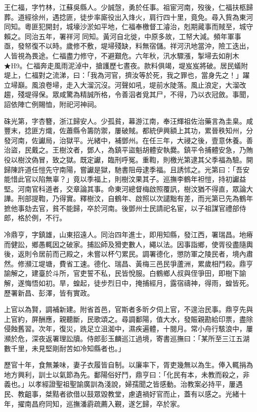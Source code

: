 \begin{pinyinscope}
王仁福，字竹林，江蘇吳縣人。少誠愨，勇於任事。祖宦河南，歿後，仁福扶柩歸葬。道經徐州，遇捻匪，徒步率廝役出入烽火，肩行四十里，竟免。尋入貲為東河同知。粵匪犯開封，城壕沙淤如平地，仁福奉檄督工濬治，剋期蕆事而賊至，城守賴之。同治五年，署祥河同知。黃河自北徙，中原多故，工帑大減。頻年軍事亟，發帑復不以時。歲修不敷，堤埽殘缺，料無宿儲。祥河汛地當沖，險工迭出，人皆視為畏途。仁福盡力修守，不避艱危。六年秋，汛水驟漲，掣埽去如削木★H9。仁福奔走風雨泥淖中，搶護歷七晝夜。款料俱竭，堤岌岌將破。居民蟻附堤上，仁福對之流涕，曰：「我為河官，擠汝等於死，我之罪也，當身先之！」躍立埽巔。風浪卷埽，走入大溜沉沒。河聲如吼，堤前水陡落。風止浪定，大溜改趨，殘堤得保。眾咸驚為精誠所格，令善泅者覓其尸，不得，乃以衣冠斂。事聞，詔依陣亡例賜恤，附祀河神祠。

硃光第，字杏簪，浙江歸安人。少孤貧，幕游江南，奉汪輝祖佐治藥言為圭臬。咸豐末，捻匪方熾，佐蕭縣令籌防禦，屢破賊。都統伊興額上其功，累晉秩知州，分發河南，佐讞局，治獄平。光緒中，補鄧州。在任三年，大祲之後，壹意休養。善治盜，民戴之。王樹汶者，鄧人，為鎮平盜魁胡體安執爨。鎮平令捕體安急，乃賄役以樹汶偽冒，致之獄。既定讞，臨刑呼冤。重鞫，則檄光第逮其父季福為驗。開歸陳許道任愷先守南陽，嘗讞是獄，馳書阻毋逮季福。且誘怵之。光第曰：「吾安能惜此官以陷無辜？」竟以季福上，則樹汶果其子。巡撫李鶴年袒愷，持初讞益堅。河南官科道者，交章論其事。命東河總督梅啟照覆訊，樹汶猶不得直，眾論大譁。刑部提鞫，乃得實。釋樹汶，自鶴年、啟照以次譴黜有差，而光第已先為鶴年摭他事劾去官，貧不能歸，卒於河南。後鄧州士民請祀名宦，以子祖謀官禮部侍郎，格於例，不行。

冷鼎亨，字鎮雄，山東招遠人。同治四年進士，即用知縣，發江西，署瑞昌。地瘠而健訟，鄉愚輒因之破家。捕訟師及猾吏數人，繩以法。因事詣鄉，使胥役盡隨輿後，返則令居前而己殿之，未嘗以杯勺累民。調署德化，懲防軍之陵民者，境內肅然。修瀕江堤塘，費省工速。德化、瑞昌、黃梅三邑民爭蘆洲，累歲相鬥殺。鼎亨諭解之，建臺於斗所，官吏誓不私，民皆悅服。白鶴鄉人叔與侄爭田，即樹下諭解，遂悔悟如初。旱，蝗起，徒步烈日中，掩捕經月，露宿禱神，得雨，蝗皆死。歷署新昌、彭澤，皆有實政。

上官以為賢，調補新建。附省首邑，官斯者多昕夕伺上官，不遑治民事。鼎亨先與上官約，屏酬應，親聽斷，民歌頌之。尋調鄱陽，值大水，發賑親勘給印票，盡除侵蝕舊習。次年，復災，跣足立沮洳中，濕疾遍體，十閱月。常小舟行駭浪中，屢瀕於危，深夜返署理訟牘。侍郎彭玉麟巡江過境，寄書巡撫曰：「某所至三江五湖數千里，未見堅剛耐苦如冷知縣者也。」

歷官十年，食無兼味，妻子衣履皆自制。以廉率下，胥吏幾無以為生。俸入輒捐為地方興利，訓士以氣節為先。鄱陽俗好鬥，鼎亨曰：「化民有本，未教而殺之，非義也。」以孝經證聖祖聖諭廣訓為淺說，婦孺聞之皆感動。治教案必持平，屢遇民、教齟事，桀黠者欲借以鼓眾毀教堂，慮遺禍好官而止，蓋有以感之。光緒十年，擢南昌府同知，巡撫潘霨疏薦入覲，遂乞歸，卒於家。


\end{pinyinscope}

